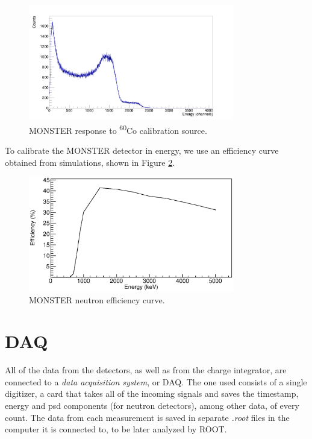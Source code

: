 \documentclass[a4paper,12pt]{report}
\begin{document}
\begin{figure}[H]
	\centering
	\includegraphics[width=0.80\textwidth]{monster_co_calibration.png}
	\caption{MONSTER response to \textsuperscript{60}Co calibration source.}
	\label{monster_co_calibration}
\end{figure}

To calibrate the MONSTER detector in energy, we use an efficiency curve obtained from simulations, shown in Figure \ref{monster_efficiency}.	%

\begin{figure}[H]
	\centering
	\includegraphics[width=0.80\textwidth]{monster_efficiency.eps}
	\caption{MONSTER neutron efficiency curve.}
	\label{monster_efficiency}
\end{figure}

\section{DAQ}
All of the data from the detectors, as well as from the charge integrator, are connected to a \textit{data acquisition system}, or DAQ.
The one used consists of a single digitizer, a card that takes all of the incoming signals and saves the timestamp, energy and psd components (for neutron detectors), among other data, of every count.
The data from each measurement is saved in separate \textit{.root} files in the computer it is connected to, to be later analyzed by ROOT.
\end{document}
